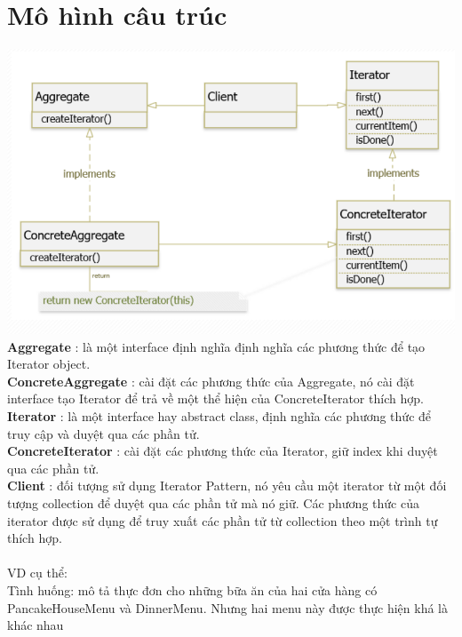 \section{Mô hình câu trúc}
\includegraphics[width=\columnwidth]{GALLEYS/images/chapter3/diagram1}\\
\textbf{Aggregate} : là một interface định nghĩa định nghĩa các phương thức để tạo Iterator object.\\
\textbf{ConcreteAggregate} : cài đặt các phương thức của Aggregate, nó cài đặt interface tạo Iterator để trả về một thể hiện của ConcreteIterator thích hợp. \\
\textbf{Iterator} :  là một interface hay abstract class, định nghĩa các phương thức để truy cập và duyệt qua các phần tử. \\
\textbf{ConcreteIterator} :  cài đặt các phương thức của Iterator, giữ index khi duyệt qua các phần tử. \\
\textbf{Client} : đối tượng sử dụng Iterator Pattern, nó yêu cầu một iterator từ một đối tượng collection để duyệt qua các phần tử mà nó giữ. Các phương thức của iterator được sử dụng để truy xuất các phần tử từ collection theo một trình tự thích hợp.\\\\
VD cụ thể:\\
Tình huống: mô tả thực đơn cho những bữa ăn của hai cửa hàng có PancakeHouseMenu và DinnerMenu. Nhưng hai menu này được thực hiện khá là khác nhau
\newpage
